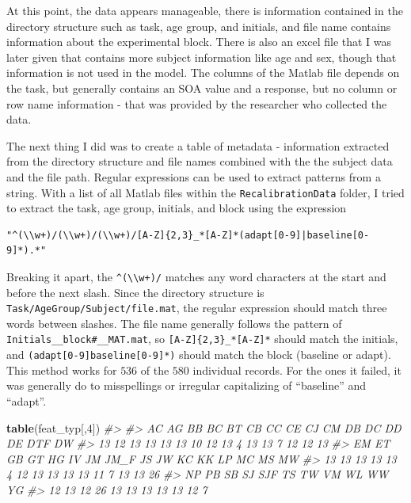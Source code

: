 \documentclass[11pt, oneside, openany]{scrbook}
\newenvironment{Shaded}{\begin{snugshade}}{\end{snugshade}}
\newcommand{\CommentTok}[1]{\textcolor[rgb]{0.56,0.35,0.01}{\textit{#1}}}
\newcommand{\DecValTok}[1]{\textcolor[rgb]{0.00,0.00,0.81}{#1}}
\newcommand{\KeywordTok}[1]{\textcolor[rgb]{0.13,0.29,0.53}{\textbf{#1}}}
\newcommand{\NormalTok}[1]{#1}
\begin{document}
At this point, the data appears manageable, there is information contained in the directory structure such as task, age group, and initials, and file name contains information about the experimental block. There is also an excel file that I was later given that contains more subject information like age and sex, though that information is not used in the model. The columns of the Matlab file depends on the task, but generally contains an SOA value and a response, but no column or row name information - that was provided by the researcher who collected the data.

The next thing I did was to create a table of metadata - information extracted from the directory structure and file names combined with the the subject data and the file path. Regular expressions can be used to extract patterns from a string. With a list of all Matlab files within the \texttt{RecalibrationData} folder, I tried to extract the task, age group, initials, and block using the expression

\begin{verbatim}
"^(\\w+)/(\\w+)/(\\w+)/[A-Z]{2,3}_*[A-Z]*(adapt[0-9]|baseline[0-9]*).*"
\end{verbatim}

Breaking it apart, the \texttt{\^{}(\textbackslash{}\textbackslash{}w+)/} matches any word characters at the start and before the next slash. Since the directory structure is \texttt{Task/AgeGroup/Subject/file.mat}, the regular expression should match three words between slashes. The file name generally follows the pattern of \texttt{Initials\_\_block\#\_\_MAT.mat}, so \texttt{{[}A-Z{]}\{2,3\}\_*{[}A-Z{]}*} should match the initials, and \texttt{(adapt{[}0-9{]}\textbar{}baseline{[}0-9{]}*)} should match the block (baseline or adapt). This method works for \(536\) of the \(580\) individual records. For the ones it failed, it was generally do to misspellings or irregular capitalizing of ``baseline'' and ``adapt''.

\begin{Shaded}
\begin{Highlighting}[]
\KeywordTok{table}\NormalTok{(feat_typ[,}\DecValTok{4}\NormalTok{])}
\CommentTok{#> }
\CommentTok{#>   AC   AG   BB   BC   BT   CB   CC   CE   CJ   CM   DB   DC   DD   DE  DTF   DW }
\CommentTok{#>   13   12   13   13   13   13   10   12   13    4   13   13    7   12   12   13 }
\CommentTok{#>   EM   ET   GB   GT   HG   IV   JM JM_F   JS   JW   KC   KK   LP   MC   MS   MW }
\CommentTok{#>   13   13   13   13   13    4   12   13   13   13   13   11    7   13   13   26 }
\CommentTok{#>   NP   PB   SB   SJ  SJF   TS   TW   VM   WL   WW   YG }
\CommentTok{#>   12   13   12   26   13   13   13   13   13   12    7}
\end{Highlighting}
\end{Shaded}
\end{document}

